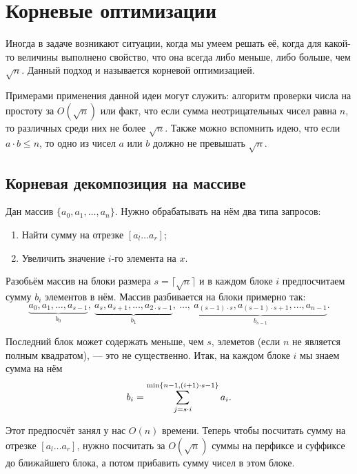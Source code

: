 \section{Корневые оптимизации}

Иногда в задаче возникают ситуации, когда мы умеем решать её, когда для какой-то величины выполнено свойство, что она всегда либо меньше, либо больше, чем $\sqrt{n}$. Данный подход и называется корневой оптимизацией.

Примерами применения данной идеи могут служить: алгоритм проверки числа на простоту за $O(\sqrt{n})$ или факт, что если сумма неотрицательных чисел равна $n$, то различных среди них не более $\sqrt{n}$. Также можно вспомнить идею, что если $a \cdot b \leqslant n$, то одно из чисел $a$ или $b$ должно не превышать $\sqrt{n}$.

\subsection{Корневая декомпозиция на массиве}

\begin{problem}
    Дан массив $\{a_0, a_1, \ldots, a_n\}$. Нужно обрабатывать на нём два типа запросов:
    \begin{enumerate}[nolistsep]
        \item Найти сумму на отрезке $[a_l\ldots a_r]$;
        \item Увеличить значение $i$-го элемента на $x$.
    \end{enumerate}
\end{problem}

Разобьём массив на блоки размера $s = \lceil\sqrt{n}\rceil$ и в каждом блоке $i$ предпосчитаем сумму $b_i$ элементов в нём. Массив разбивается на блоки примерно так:
\[
    \underbrace{a_0, a_1, \ldots, a_{s - 1}}_{b_0},\ \underbrace{a_s, a_{s + 1}, \ldots, a_{2 \cdot s - 1}}_{b_1},\ \ldots,\ \underbrace{a_{(s - 1) \cdot s}, a_{(s - 1) \cdot s + 1}, \ldots, a_{n - 1}}_{b_{s - 1}}.
\]

Последний блок может содержать меньше, чем $s$, элеметов (если $n$ не является полным квадратом), --- это не существенно. Итак, на каждом блоке $i$ мы знаем сумма на нём
\[
    b_i = \displaystyle\sum_{j = s \cdot i}^{\min\{n - 1, (i + 1) \cdot s - 1\}}a_i.
\]

Этот предпосчёт занял у нас $O(n)$ времени. Теперь чтобы посчитать сумму на отрезке $[a_l\ldots a_r]$, нужно посчитать за $O(\sqrt{n})$ суммы на перфиксе и суффиксе до ближайшего блока, а потом прибавить сумму чисел в этом блоке.

